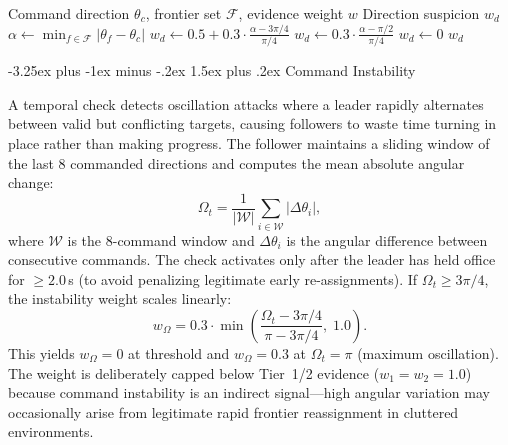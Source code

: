 \documentclass[conference]{IEEEtran}
\makeatletter
\renewcommand{\subsection}{\@startsection{subsection}{2}{\z@}%
  {-3.25ex plus -1ex minus -.2ex}%
  {1.5ex plus .2ex}%
  {\normalfont\normalsize\itshape\centering}}
\makeatother
\begin{document}
\begin{algorithm}[h]
\caption{Direction Consistency Check}
\label{alg:direction}
\begin{algorithmic}[1]
\REQUIRE Command direction $\theta_c$, frontier set $\mathcal{F}$,
         evidence weight $w$
\ENSURE Direction suspicion $w_d$
\STATE $\alpha \leftarrow \min_{f \in \mathcal{F}}
       \lvert\theta_f - \theta_c\rvert$
    \STATE $w_d \leftarrow 0.5 + 0.3 \cdot
           \frac{\alpha - 3\pi/4}{\pi/4}$
    \STATE $w_d \leftarrow 0.3 \cdot
           \frac{\alpha - \pi/2}{\pi/4}$
\ELSE
    \STATE $w_d \leftarrow 0$
\ENDIF
\RETURN $w_d$
\end{algorithmic}
\end{algorithm}

\subsection{Command Instability}
\label{sec:command_instability}

A temporal check detects oscillation attacks where a leader rapidly alternates between valid but conflicting targets, causing followers to waste time turning in place rather than making progress. The follower maintains a sliding window of the last 8 commanded directions and computes the mean absolute angular change:
\begin{equation}
    \Omega_t = \frac{1}{|\mathcal{W}|} \sum_{i \in \mathcal{W}} |\Delta\theta_i|,
\end{equation}
where $\mathcal{W}$ is the 8-command window and $\Delta\theta_i$ is the angular difference between consecutive commands. The check activates only after the leader has held office for $\geq 2.0\,$s (to avoid penalizing legitimate early re-assignments). If $\Omega_t \geq 3\pi/4$, the instability weight scales linearly:
\begin{equation}
    w_{\Omega} = 0.3 \cdot \min\!\left(\frac{\Omega_t - 3\pi/4}{\pi - 3\pi/4},\; 1.0\right).
\end{equation}
This yields $w_{\Omega} = 0$ at threshold and $w_{\Omega} = 0.3$ at $\Omega_t = \pi$ (maximum oscillation). The weight is deliberately capped below Tier~1/2 evidence ($w_1 = w_2 = 1.0$) because command instability is an indirect signal---high angular variation may occasionally arise from legitimate rapid frontier reassignment in cluttered environments.
\end{document}
